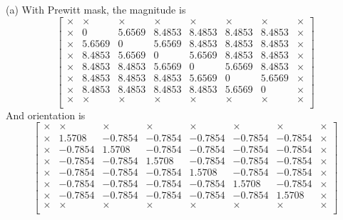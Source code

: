 \documentclass[12pt]{article}
\begin{document}
(a) With Prewitt mask, the magnitude is 
\begin{equation*}
\left[ \begin{array}{cccccccc}
\times & \times & \times  &\times & \times &\times&\times& \times\\
\times & 0&   5.6569&  8.4853&  8.4853&  8.4853&  8.4853& \times\\
\times&      5.6569&  0&      5.6569&  8.4853&  8.4853&  8.4853& \times\\
\times&  8.4853&  5.6569&  0&     5.6569&  8.4853&  8.4853& \times\\
\times & 8.4853 & 8.4853 & 5.6569 & 0&     5.6569&  8.4853 & \times\\
\times & 8.4853&  8.4853 & 8.4853  &5.6569&  0&     5.6569 & \times\\
\times & 8.4853 & 8.4853 & 8.4853 & 8.4853  &5.6569 & 0&   \times\\
\times &\times& \times & \times &\times & \times&\times  &\times\\
\end{array} \right]
\end{equation*}
And orientation is
\begin{equation*}
\left[ \begin{array}{cccccccc}
\times & \times & \times  &\times & \times &\times&\times& \times\\
\times & 1.5708& -0.7854& -0.7854 &-0.7854& -0.7854 &-0.7854  &\times\\
\times& -0.7854 & 1.5708 &-0.7854 &-0.7854 &-0.7854& -0.7854& \times\\
\times& -0.7854& -0.7854 & 1.5708 &-0.7854& -0.7854& -0.7854  &\times\\
\times &-0.7854& -0.7854& -0.7854 & 1.5708& -0.7854& -0.7854 & \times\\
\times&-0.7854& -0.7854 &-0.7854& -0.7854 & 1.5708& -0.7854 &\times\\
\times& -0.7854& -0.7854 &-0.7854& -0.7854 &-0.7854 & 1.5708 & \times \\
\times &\times& \times & \times &\times & \times&\times  &\times\\
\end{array} \right]
\end{equation*}
\end{document}
